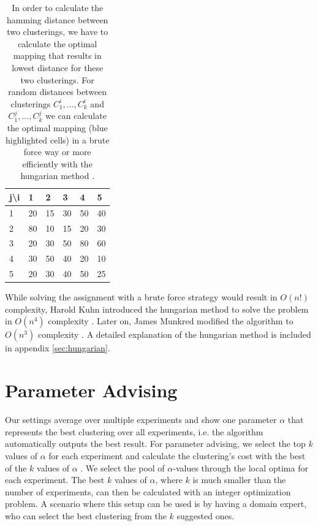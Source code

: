 \begin{table}[h]
    \centering
    \begin{tabular}{|l | l l l l l|}
    \hline
    j\textbackslash i & 1 & 2 & 3 & 4 & 5\\ \hline
    1 & 20 & \cellcolor{blue!25}15 & 30 & 50 & 40\\
    2 & 80 & 10 & \cellcolor{blue!25}15 & 20 & 30\\
    3 & \cellcolor{blue!25}20 & 30 & 50 & 80 & 60\\
    4 & 30 & 50 & 40 & \cellcolor{blue!25}20 & 10\\
    5 & 20 & 30 & 40 & 50 & \cellcolor{blue!25}25\\ \hline
    \end{tabular}
    \caption{In order to calculate the hamming distance between two clusterings, we have to calculate the optimal mapping that results in lowest distance for these two clusterings. For random distances between clusterings $C_1^i, ..., C_k^i$ and $C_1^j, ..., C_k^j$ we can calculate the optimal mapping (blue highlighted cells) in a brute force way or more efficiently with the hungarian method \cite{kuhn1955hungarian}\cite{munkres1957algorithms}.}
    \label{table:matching}
\end{table}

While solving the assignment with a brute force strategy would result in $O(n!)$ complexity, Harold Kuhn introduced the hungarian method to solve the problem in $O(n^4)$ complexity \cite{kuhn1955hungarian}. Later on, James Munkred modified the algorithm to $O(n^3)$ complexity \cite{munkres1957algorithms}. A detailed explanation of the hungarian method is included in appendix \ref{sec:hungarian}.


\section{Parameter Advising}

Our settings average over multiple experiments and show one parameter $\alpha$ that represents the best clustering over all experiments, i.e. the algorithm automatically outputs the best result. For parameter advising, we select the top $k$ values of $\alpha$ for each experiment and calculate the clustering's cost with the best of the $k$ values of $\alpha$ \cite{deblasio2015parameter}. We select the pool of $\alpha$-values through the local optima for each experiment. The best $k$ values of $\alpha$, where $k$ is much smaller than the number of experiments, can then be calculated with an integer optimization problem. A scenario where this setup can be used is by having a domain expert, who can select the best clustering from the $k$ suggested ones.\\

